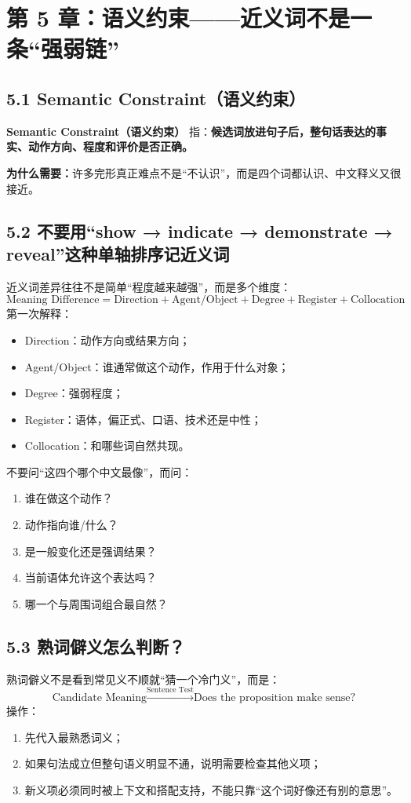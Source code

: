 \documentclass[11pt,a4paper]{ctexart}
\newcommand{\kw}[1]{\textbf{#1}}
\newcommand{\term}[2]{\textbf{#1（#2）}}
\begin{document}
\section{第 5 章：语义约束——近义词不是一条“强弱链”}

\subsection{5.1 Semantic Constraint（语义约束）}
\term{Semantic Constraint}{语义约束} 指：\kw{候选词放进句子后，整句话表达的事实、动作方向、程度和评价是否正确。}

\kw{为什么需要：}许多完形真正难点不是“不认识”，而是四个词都认识、中文释义又很接近。

\subsection{5.2 不要用“show → indicate → demonstrate → reveal”这种单轴排序记近义词}
近义词差异往往不是简单“程度越来越强”，而是多个维度：
\[
\boxed{
\text{Meaning Difference}
=
\text{Direction}
+
\text{Agent/Object}
+
\text{Degree}
+
\text{Register}
+
\text{Collocation}
}
\]
第一次解释：
\begin{itemize}
  \item Direction：动作方向或结果方向；
  \item Agent/Object：谁通常做这个动作，作用于什么对象；
  \item Degree：强弱程度；
  \item Register：语体，偏正式、口语、技术还是中性；
  \item Collocation：和哪些词自然共现。
\end{itemize}

\begin{exam}[近义词辨析时的五问]
不要问“这四个哪个中文最像”，而问：
\begin{enumerate}
  \item 谁在做这个动作？
  \item 动作指向谁/什么？
  \item 是一般变化还是强调结果？
  \item 当前语体允许这个表达吗？
  \item 哪一个与周围词组合最自然？
\end{enumerate}
\end{exam}

\subsection{5.3 熟词僻义怎么判断？}
熟词僻义不是看到常见义不顺就“猜一个冷门义”，而是：
\[
\boxed{
\text{Candidate Meaning}
\xrightarrow{\text{Sentence Test}}
\text{Does the proposition make sense?}
}
\]
操作：
\begin{enumerate}
  \item 先代入最熟悉词义；
  \item 如果句法成立但整句语义明显不通，说明需要检查其他义项；
  \item 新义项必须同时被上下文和搭配支持，不能只靠“这个词好像还有别的意思”。
\end{enumerate}
\end{document}
